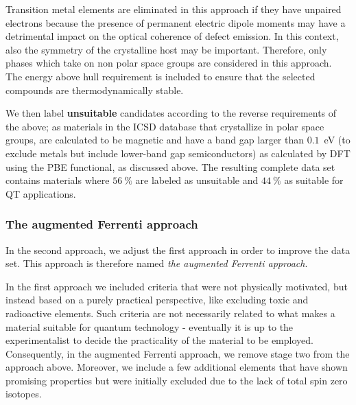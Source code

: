 \documentclass[superscriptaddress,unsortedaddress,
 amsmath,amssymb,
 aps,
]{revtex4-2}
\begin{document}
Transition metal elements are eliminated in this approach if they have unpaired electrons because the presence of permanent electric dipole moments may have a detrimental impact on the optical coherence of defect emission. In this context, also the symmetry of the crystalline host may be important. Therefore, only phases which take on non polar space groups are considered in this approach. 
The energy above hull requirement is included to ensure that the selected compounds are thermodynamically stable. 

We then label \textbf{unsuitable} candidates according to the reverse requirements of the above; as materials in the ICSD database %
that crystallize in polar space groups, are calculated to be magnetic and have a band gap larger than $0.1$~eV (to exclude metals but include lower-band gap semiconductors) as calculated by DFT using the PBE functional, as discussed above.
The resulting complete data set contains materials where $56 \ \%$ are labeled as unsuitable and $44 \ \%$ as suitable for QT applications. 

\subsubsection*{The augmented Ferrenti approach}
In the second approach, we adjust the first approach in order to improve the data set. This approach is therefore named \emph{the augmented Ferrenti approach}.

In the first approach we included criteria that were not physically motivated, but instead based on a purely practical perspective, like excluding toxic and radioactive elements. Such criteria are not necessarily related to what makes a material suitable for quantum technology - eventually it is up to the experimentalist to decide the practicality of the material to be employed. 
Consequently, in the augmented Ferrenti approach, we remove stage two from the approach above. Moreover, we include a few additional elements that have shown promising properties but were initially excluded due to the lack of total spin zero isotopes. 
\end{document}
